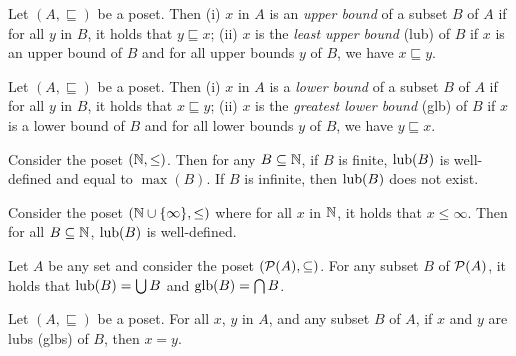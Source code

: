 \begin{definition}
    Let $(A,\sqsubseteq)$ be a poset. Then (i) $x$ in $A$ is an \emph{upper bound} of a subset $B$ of $A$ if for all $y$ in $B$, it holds that $y \sqsubseteq x$;
    (ii) $x$ is the \emph{least upper bound} (lub) of $B$ if $x$ is an upper bound of $B$ and for all upper bounds $y$ of $B$, we have $x \sqsubseteq y$. %
\end{definition}

\begin{definition}
    Let $(A,\sqsubseteq)$ be a poset. Then (i) $x$ in $A$ is a \emph{lower bound} of a subset $B$ of $A$ if for all $y$ in $B$, it holds that $x \sqsubseteq y$;
    (ii) $x$ is the \emph{greatest lower bound} (glb) of $B$ if $x$ is a lower bound of $B$ and for all lower bounds $y$ of $B$, we have $y \sqsubseteq x$. %
\end{definition}

\begin{example}
    Consider the poset $(\mathbb{N},\leq)$. Then for any $B \subseteq \mathbb{N}$, if $B$ is finite, $\operatorname{lub}(B)$ is well-defined and equal to $\max(B)$. If $B$ is infinite, then $\operatorname{lub}(B)$ does not exist.
\end{example}

\begin{example}
   Consider the poset $(\mathbb{N} \cup \{\infty\},\leq)$ where for all $x$ in $\mathbb{N}$, it holds that $x \leq \infty$. Then for all $B \subseteq \mathbb{N}$, $\operatorname{lub}(B)$ is well-defined.
\end{example}

\begin{example}
    Let $A$ be any set and consider the poset $(\mathcal{P}(A),\subseteq)$. For any subset $B$ of $\mathcal{P}(A)$, it holds that $\operatorname{lub}(B) = \bigcup B$ and $\operatorname{glb}(B) = \bigcap B$.
\end{example}

\begin{lemma}
  Let $(A,\sqsubseteq)$ be a poset. For all $x$, $y$ in $A$, and any subset $B$ of $A$, if $x$ and $y$ are lubs (glbs) of $B$, then $x = y$.
\end{lemma}

